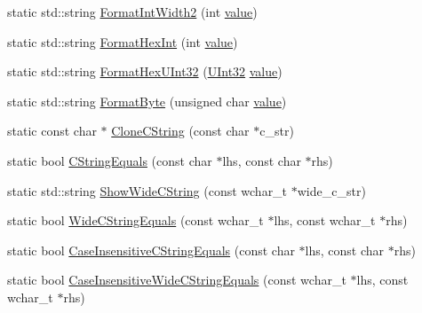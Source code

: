 \begin{DoxyCompactItemize}
\item 
static std\+::string \mbox{\hyperlink{classtesting_1_1internal_1_1_string_a51cab855f7ec6091e5886b6be5598ca2}{Format\+Int\+Width2}} (int \mbox{\hyperlink{_obj__test_2lib_2googletest-master_2googlemock_2test_2gmock-matchers__test_8cc_a337b8a670efc0b086ad3af163f3121b6}{value}})
\item 
static std\+::string \mbox{\hyperlink{classtesting_1_1internal_1_1_string_a7bedf4780e0c938d203b73ddb17ff490}{Format\+Hex\+Int}} (int \mbox{\hyperlink{_obj__test_2lib_2googletest-master_2googlemock_2test_2gmock-matchers__test_8cc_a337b8a670efc0b086ad3af163f3121b6}{value}})
\item 
static std\+::string \mbox{\hyperlink{classtesting_1_1internal_1_1_string_a6dda06d6a56456928672287cdec5459b}{Format\+Hex\+U\+Int32}} (\mbox{\hyperlink{namespacetesting_1_1internal_a436defbb8e92c8e94e33ebcc86f278ba}{U\+Int32}} \mbox{\hyperlink{_obj__test_2lib_2googletest-master_2googlemock_2test_2gmock-matchers__test_8cc_a337b8a670efc0b086ad3af163f3121b6}{value}})
\item 
static std\+::string \mbox{\hyperlink{classtesting_1_1internal_1_1_string_ab3555eeb6abe4b7c6f63d865af10379d}{Format\+Byte}} (unsigned char \mbox{\hyperlink{_obj__test_2lib_2googletest-master_2googlemock_2test_2gmock-matchers__test_8cc_a337b8a670efc0b086ad3af163f3121b6}{value}})
\item 
static const char $\ast$ \mbox{\hyperlink{classtesting_1_1internal_1_1_string_a8bce6b1281ae3d2f9061b920aa78aca0}{Clone\+C\+String}} (const char $\ast$c\+\_\+str)
\item 
static bool \mbox{\hyperlink{classtesting_1_1internal_1_1_string_a06919f642bd47f0593196b460d352f24}{C\+String\+Equals}} (const char $\ast$lhs, const char $\ast$rhs)
\item 
static std\+::string \mbox{\hyperlink{classtesting_1_1internal_1_1_string_acbf0511e9ae5009f42de77e565f6ba61}{Show\+Wide\+C\+String}} (const wchar\+\_\+t $\ast$wide\+\_\+c\+\_\+str)
\item 
static bool \mbox{\hyperlink{classtesting_1_1internal_1_1_string_a4f5e053907ebced07fe0dc52dd2d1e85}{Wide\+C\+String\+Equals}} (const wchar\+\_\+t $\ast$lhs, const wchar\+\_\+t $\ast$rhs)
\item 
static bool \mbox{\hyperlink{classtesting_1_1internal_1_1_string_a7ce24c41c67b928fe89434d3571c988c}{Case\+Insensitive\+C\+String\+Equals}} (const char $\ast$lhs, const char $\ast$rhs)
\item 
static bool \mbox{\hyperlink{classtesting_1_1internal_1_1_string_a0a67eac434fa7800640c9d56cb91e105}{Case\+Insensitive\+Wide\+C\+String\+Equals}} (const wchar\+\_\+t $\ast$lhs, const wchar\+\_\+t $\ast$rhs)

\end{DoxyCompactItemize}
